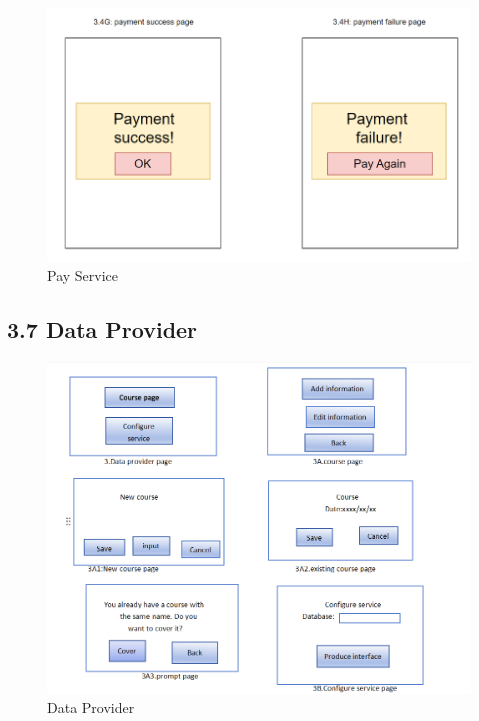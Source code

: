 \documentclass[a4paper,12pt]{article}
\begin{document}
\begin{figure}[H]
    \begin{center}
        \includegraphics[width=\textwidth]{picture/0456.png}
        \caption{Pay Service}
        \label{fig:access-thesis}
    \end{center}
\end{figure}

\subsection*{3.7 Data Provider}
\begin{figure}[H]
    \begin{center}
        \includegraphics[width=\textwidth]{picture/WechatIMG1920.jpg}
        \caption{Data Provider}
        \label{fig:provide-course-info}
    \end{center}
\end{figure}
\end{document}
